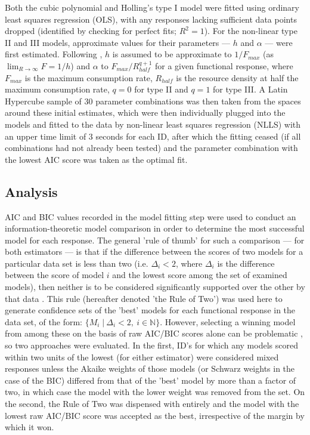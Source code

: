 \documentclass[11pt]{article}
\begin{document}
    Both the cubic polynomial and Holling's type I model were fitted using ordinary least squares regression (OLS), with any responses lacking sufficient data points dropped (identified by checking for perfect fits; $R^2=1$). For the non-linear type II and III models, approximate values for their parameters — $h$ and $\alpha$ — were first estimated. Following \citet{real1977kinetics}, $h$ is assumed to be approximate to $1/F_{max}$ (as $\lim_{R\to\infty}F=1/h$) and $\alpha$ to $F_{max}/R_{half}^{q+1}$ for a given functional response, where $F_{max}$ is the maximum consumption rate,  $R_{half}$ is the resource density at half the maximum consumption rate, $q=0$ for type II and $q=1$ for type III. A Latin Hypercube sample of 30 parameter combinations was then taken from the spaces around these initial estimates, which were then individually plugged into the models and fitted to the data by non-linear least squares regression (NLLS) with an upper time limit of 3 seconds for each ID, after which the fitting ceased (if all combinations had not already been tested) and the parameter combination with the lowest AIC score was taken as the optimal fit.
    
    \subsection{Analysis}
    
    AIC and BIC values recorded in the model fitting step were used to conduct an information-theoretic model comparison in order to determine the most successful model for each response. The general 'rule of thumb' for such a comparison — for both estimators — is that if the difference between the scores of two models for a particular data set is less than two  (i.e.  $\Delta_i<2$, where $\Delta_i$ is the difference between the score of model $i$ and the lowest score among the set of examined models), then neither is to be considered significantly supported over the other by that data \citep{anderson2004model}. This rule (hereafter denoted 'the Rule of Two') was used here to generate confidence sets of the 'best' models for each functional response in the data set, of the form: $\{M_{i}\;|\:\Delta _{i} < 2,\:i\in\mathbb{N}\}$. However, selecting a winning model from among these on the basis of raw AIC/BIC scores alone can be problematic \citep{wagenmakers2004aic}, so two approaches were evaluated. In the first, ID's for which any models scored within two units of the lowest (for either estimator) were considered mixed responses unless the Akaike weights of those models (or Schwarz weights in the case of the BIC) differed from that of the 'best' model by more than a factor of two, in which case the model with the lower weight was removed from the set. On the second, the Rule of Two was dispensed with entirely and the model with the lowest raw AIC/BIC score was accepted as the best, irrespective of the margin by which it won.
    
\end{document}
